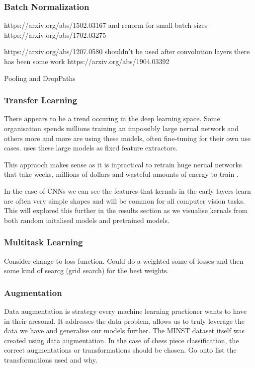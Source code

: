 \subsubsection{Batch Normalization}
https://arxiv.org/abs/1502.03167 and renorm for small batch sizes https://arxiv.org/abs/1702.03275

https://arxiv.org/abs/1207.0580 shouldn't be used after convolution layers \cite{} there has been some work https://arxiv.org/abs/1904.03392

Pooling and DropPaths

\subsubsection{Transfer Learning}
There appears to be a trend occuring in the deep learning space.  Some organisation spends millions training an impossibly large nerual network
and others more and more are using these models, often fine-tuning for their own use cases.  \cite{} uses these large models as fixed feature extractors.

This appraoch makes sense as it is inpractical to retrain huge nerual networks that take weeks, millions of dollars and wasteful amounts of energy
to train \cite{}.

In the case of CNNs we can see the features that kernals in the early layers learn \cite{} are often very simple shapes and will be common for all
computer vision tasks.  This will explored this further in the results section as we visualise kernals from both random initalised models and 
pretrained models.

\subsubsection{Multitask Learning}

Consider change to loss function.  Could do a weighted some of losses and then some kind of searcg (grid search) for the best weights.

\subsubsection{Augmentation}
Data augmentation is strategy every machine learning practioner wants to have in their aresonal.  It addresses the data problem, allows us to truly 
leverage the data we have and generalise our models further.  The MINST \cite{} dataset itself was created using data augmentation.
In the case of chess piece classification, the correct augmentations or transformations should be chosen.
Go onto list the transformations used and why.


